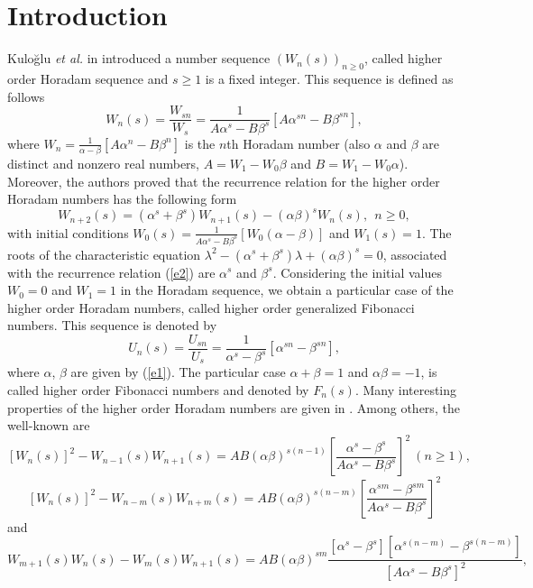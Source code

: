 \documentclass{kms-c}
\theoremstyle{plain}
\theoremstyle{definition}
\theoremstyle{remark}
\begin{document}
\section{Introduction}
Kulo\u{g}lu {\it et al.} in \cite{Kul} introduced a number sequence $\left(W_{n}(s)\right)_{n\geq 0}$, called higher order Horadam sequence and $s\geq 1$ is a fixed integer. This sequence is defined as follows
\begin{equation}\label{e1}
W_{n}(s)=\frac{W_{sn}}{W_{s}}=\frac{1}{A\alpha^{s}-B\beta^{s}}\left[A\alpha^{sn}-B\beta^{sn}\right],
\end{equation}
where $W_{n}=\frac{1}{\alpha-\beta}\left[A\alpha^{n}-B\beta^{n}\right]$ is the $n$th Horadam number (also $\alpha$ and $\beta$ are distinct and nonzero real numbers, $A=W_{1}-W_{0}\beta$ and $B=W_{1}-W_{0}\alpha$). Moreover, the authors proved that the recurrence relation for the higher order Horadam numbers has the following form
\begin{equation}\label{e2}
W_{n+2}(s)=\left(\alpha^{s}+\beta^{s}\right)W_{n+1}(s)-\left(\alpha\beta\right)^{s}W_{n}(s),\ \ n\geq 0,
\end{equation}
with initial conditions $W_{0}(s)=\frac{1}{A\alpha^{s}-B\beta^{s}}\left[W_{0}(\alpha-\beta)\right]$ and $W_{1}(s)=1$. The roots of the characteristic equation $\lambda^{2}-\left(\alpha^{s}+\beta^{s}\right)\lambda+\left(\alpha\beta\right)^{s}=0$, associated with the recurrence relation (\ref{e2}) are $\alpha^{s}$ and $\beta^{s}$. Considering the initial values $W_{0}=0$ and $W_{1}=1$ in the Horadam sequence, we obtain a particular case of the higher order Horadam numbers, called higher order generalized Fibonacci numbers. This sequence is denoted by
\begin{equation}\label{e3}
U_{n}(s)=\frac{U_{sn}}{U_{s}}=\frac{1}{\alpha^{s}-\beta^{s}}\left[\alpha^{sn}-\beta^{sn}\right],
\end{equation}
where $\alpha$, $\beta$ are given by (\ref{e1}). The particular case $\alpha+\beta=1$ and $\alpha\beta=-1$, is called higher order Fibonacci numbers and denoted by $F_{n}(s)$. Many interesting properties of the higher order Horadam numbers are given in \cite{Kul}. Among others, the well-known are
\[
\left[W_{n}(s)\right]^{2}-W_{n-1}(s)W_{n+1}(s)=AB(\alpha\beta)^{s(n-1)}\left[\frac{\alpha^{s}-\beta^{s}}{A\alpha^{s}-B\beta^{s}}\right]^{2} \ (n\geq 1),
\]
\[
\left[W_{n}(s)\right]^{2}-W_{n-m}(s)W_{n+m}(s)=AB(\alpha\beta)^{s(n-m)}\left[\frac{\alpha^{sm}-\beta^{sm}}{A\alpha^{s}-B\beta^{s}}\right]^{2} 
\]
and
\[
W_{m+1}(s)W_{n}(s)-W_{m}(s)W_{n+1}(s)=AB(\alpha\beta)^{sm}\frac{\left[\alpha^{s}-\beta^{s}\right]\left[\alpha^{s(n-m)}-\beta^{s(n-m)}\right]}{\left[A\alpha^{s}-B\beta^{s}\right]^{2}},
\]
\end{document}
